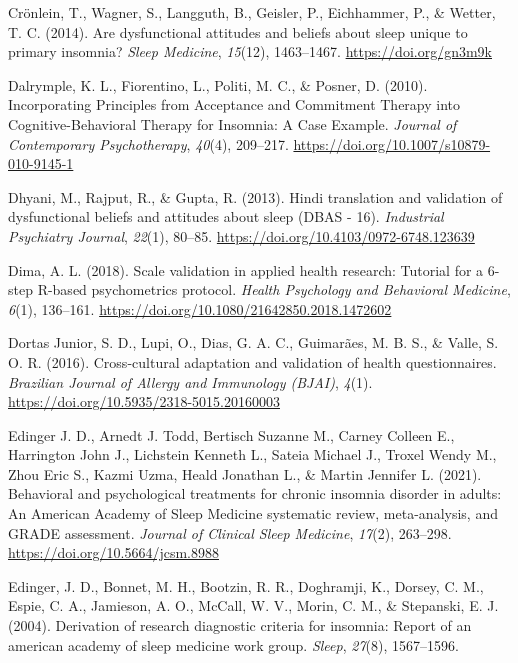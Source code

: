 \documentclass[
  ,doc,11pt, twoside,floatsintext]{apa6}
\newlength{\cslhangindent}
\newlength{\cslentryspacingunit} %
\newenvironment{CSLReferences}[2] %
 {%
  \setlength{\parindent}{0pt}
  \ifodd #1
  \let\oldpar\par
  \def\par{\hangindent=\cslhangindent\oldpar}
  \fi
  \setlength{\parskip}{#2\cslentryspacingunit}
 }%
 {}
\begin{document}
\begin{CSLReferences}{1}{0}
\leavevmode{}%
Crönlein, T., Wagner, S., Langguth, B., Geisler, P., Eichhammer, P., \& Wetter, T. C. (2014). Are dysfunctional attitudes and beliefs about sleep unique to primary insomnia? \emph{Sleep Medicine}, \emph{15}(12), 1463--1467. \url{https://doi.org/gn3m9k}

\leavevmode{}%
Dalrymple, K. L., Fiorentino, L., Politi, M. C., \& Posner, D. (2010). Incorporating {Principles} from {Acceptance} and {Commitment Therapy} into {Cognitive-Behavioral Therapy} for {Insomnia}: {A Case Example}. \emph{Journal of Contemporary Psychotherapy}, \emph{40}(4), 209--217. \url{https://doi.org/10.1007/s10879-010-9145-1}

\leavevmode{}%
Dhyani, M., Rajput, R., \& Gupta, R. (2013). Hindi translation and validation of dysfunctional beliefs and attitudes about sleep ({DBAS} - 16). \emph{Industrial Psychiatry Journal}, \emph{22}(1), 80--85. \url{https://doi.org/10.4103/0972-6748.123639}

\leavevmode{}%
Dima, A. L. (2018). Scale validation in applied health research: Tutorial for a 6-step {R-based} psychometrics protocol. \emph{Health Psychology and Behavioral Medicine}, \emph{6}(1), 136--161. \url{https://doi.org/10.1080/21642850.2018.1472602}

\leavevmode{}%
Dortas Junior, S. D., Lupi, O., Dias, G. A. C., Guimarães, M. B. S., \& Valle, S. O. R. (2016). {Cross-cultural adaptation and validation of health questionnaires}. \emph{Brazilian Journal of Allergy and Immunology (BJAI)}, \emph{4}(1). \url{https://doi.org/10.5935/2318-5015.20160003}

\leavevmode{}%
Edinger J. D., Arnedt J. Todd, Bertisch Suzanne M., Carney Colleen E., Harrington John J., Lichstein Kenneth L., Sateia Michael J., Troxel Wendy M., Zhou Eric S., Kazmi Uzma, Heald Jonathan L., \& Martin Jennifer L. (2021). Behavioral and psychological treatments for chronic insomnia disorder in adults: An {American Academy} of {Sleep Medicine} systematic review, meta-analysis, and {GRADE} assessment. \emph{Journal of Clinical Sleep Medicine}, \emph{17}(2), 263--298. \url{https://doi.org/10.5664/jcsm.8988}

\leavevmode{}%
Edinger, J. D., Bonnet, M. H., Bootzin, R. R., Doghramji, K., Dorsey, C. M., Espie, C. A., Jamieson, A. O., McCall, W. V., Morin, C. M., \& Stepanski, E. J. (2004). Derivation of research diagnostic criteria for insomnia: Report of an american academy of sleep medicine work group. \emph{Sleep}, \emph{27}(8), 1567--1596.


\end{CSLReferences}
\end{document}
